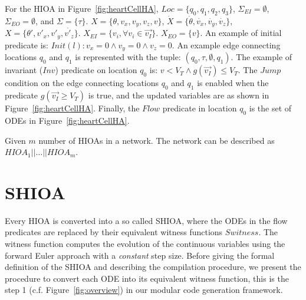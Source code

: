 For the \ac{HIOA} in Figure~\ref{fig:heartCellHA},
$Loc=\{q_{0},q_{1},q_{2},q_{3}\}$, $\Sigma_{EI} = \emptyset$,
$\Sigma_{EO}=\emptyset$, and
$\Sigma=\{\tau\}$. $X=\{\theta,v_{x},v_{y},v_{z},v\}$,
\mbox{$\dot{X}=\{\dot{\theta},\dot{v_{x}},\dot{v_{y}},\dot{v_{z}}\}$},
\mbox{$X=\{\theta',{v'_{x}},{v'_{y}},\dot{v'_{z}}\}$}.
$X_{EI}=\{v_{i}, \forall v_{i} \in \vec{v_{I}}\}$.  $X_{EO}=\{v\}$. An
example of initial predicate is:
$Init(l): v_{x}=0 \wedge v_{y}=0 \wedge v_{z}=0$. An example edge
connecting locations $q_{0}$ and $q_{1}$ is represented with the tuple:
$(q_{0},\tau,\emptyset,q_{1})$. The example of invariant ($Inv$)
predicate on location $q_{0}$ is:
$v < V_{T} \wedge g(\vec{v_{I}}) \leq V_{T}$. The $Jump$ condition on
the edge connecting locations $q_{0}$ and $q_{1}$ is enabled when the
predicate \mbox{$g(\vec{v_{I}} \geq V_{T})$} is true, and the updated
variables are as shown in Figure~\ref{fig:heartCellHA}. Finally, the
$Flow$ predicate in location $q_{0}$ is the set of ODEs in
Figure~\ref{fig:heartCellHA}.



{\color{red} Given $m$ number of \acp{HIOA} in a network.  The network
  can be described as $HIOA_1 || \dots || HIOA_m$.}


\section{\acf{SHIOA}}
\label{sec:SHA}

Every \ac{HIOA} is converted into a so called \ac{SHIOA}, where the ODEs
in the flow predicates are replaced by their equivalent witness
functions $Switness$. The witness function computes the evolution of the
continuous variables using the forward Euler approach with a
\emph{constant} step size. Before giving the formal definition of the
\ac{SHIOA} and describing the compilation procedure, we present the
procedure to convert each ODE into its equivalent witness function, this
is the step 1 (c.f. Figure~\ref{fig:overview}) in our modular code
generation framework.

